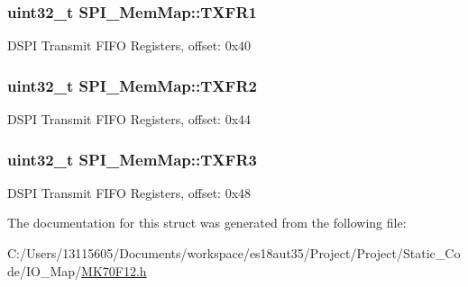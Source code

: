 \subsubsection[{T\+X\+F\+R1}]{\setlength{\rightskip}{0pt plus 5cm}uint32\+\_\+t S\+P\+I\+\_\+\+Mem\+Map\+::\+T\+X\+F\+R1}\label{struct_s_p_i___mem_map_aa4c8bc4c6c43cb03d266084ead4948f6}
D\+S\+P\+I Transmit F\+I\+F\+O Registers, offset\+: 0x40 \hypertarget{struct_s_p_i___mem_map_a2e65235ded22e36d3dae2b17f172a32b}{}
\subsubsection[{T\+X\+F\+R2}]{\setlength{\rightskip}{0pt plus 5cm}uint32\+\_\+t S\+P\+I\+\_\+\+Mem\+Map\+::\+T\+X\+F\+R2}\label{struct_s_p_i___mem_map_a2e65235ded22e36d3dae2b17f172a32b}
D\+S\+P\+I Transmit F\+I\+F\+O Registers, offset\+: 0x44 \hypertarget{struct_s_p_i___mem_map_a817203724ca73f53cc544f887eeabd27}{}
\subsubsection[{T\+X\+F\+R3}]{\setlength{\rightskip}{0pt plus 5cm}uint32\+\_\+t S\+P\+I\+\_\+\+Mem\+Map\+::\+T\+X\+F\+R3}\label{struct_s_p_i___mem_map_a817203724ca73f53cc544f887eeabd27}
D\+S\+P\+I Transmit F\+I\+F\+O Registers, offset\+: 0x48 

The documentation for this struct was generated from the following file\+:\begin{DoxyCompactItemize}
\item 
C\+:/\+Users/13115605/\+Documents/workspace/es18aut35/\+Project/\+Project/\+Static\+\_\+\+Code/\+I\+O\+\_\+\+Map/\hyperlink{_m_k70_f12_8h}{M\+K70\+F12.\+h}\end{DoxyCompactItemize}

